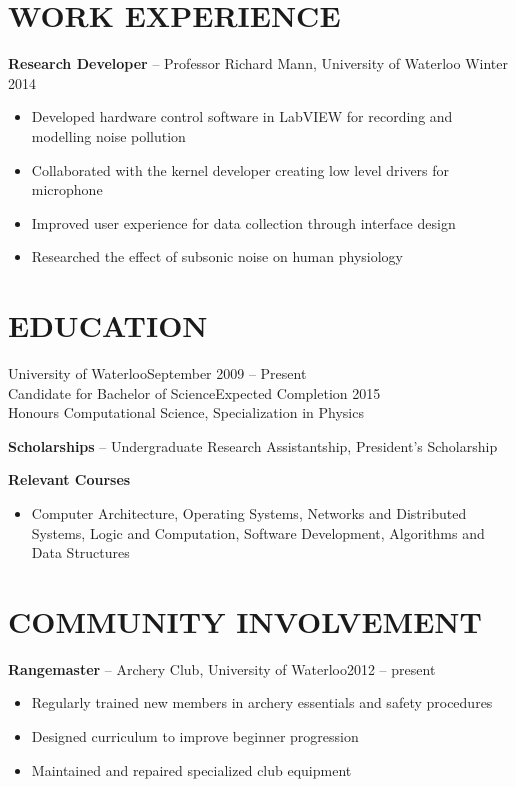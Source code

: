 \documentclass{res}
\begin{document}
\begin{resume}
\section{WORK EXPERIENCE}
  \vspace{3mm}
    {\bf Research Developer} -- Professor Richard Mann, University of Waterloo	\hfill Winter 2014\\
    \vspace{-2mm}
   \begin{itemize}
    \item Developed hardware control software in LabVIEW for recording and modelling noise pollution
    \item Collaborated with the kernel developer creating low level drivers for microphone
    \item Improved user experience for data collection through interface design
    \item Researched the effect of subsonic noise on human physiology
    
   \end{itemize}

   
\section{EDUCATION}          
  \vspace{3mm}
    University of Waterloo\hfill September 2009 -- Present\\
    Candidate for Bachelor of Science\hfill Expected Completion 2015\\
    Honours Computational Science, Specialization in Physics
    \vspace{-3mm}
    
    {\bf Scholarships} -- Undergraduate Research Assistantship, President's Scholarship
    \vspace{-3mm}
    
    {\bf Relevant Courses}
      \vspace{1mm}
      \begin{itemize}
       \item Computer Architecture, Operating Systems, Networks and Distributed Systems, Logic and Computation, Software Development, Algorithms and Data Structures
      \end{itemize}
    
    
\section{COMMUNITY INVOLVEMENT}
    \vspace{3mm}
    {\bf Rangemaster} -- Archery Club, University of Waterloo\hfill 2012 -- present\\
    \vspace{-2mm}
   \begin{itemize}
    \item Regularly trained new members in archery essentials and safety procedures
    \item Designed curriculum to improve beginner progression
    \item Maintained and repaired specialized club equipment
   \end{itemize}
   

\end{resume}
\end{document}
